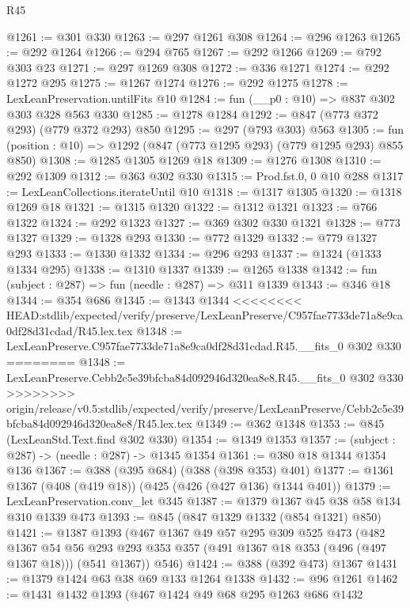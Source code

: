 \begin{lexlean}{R45}
\begin{coremodule}
{{{{{{{{{@1261 := @301 @330
@1263 := @297 @1261 @308
@1264 := @296 @1263
@1265 := @292 @1264
@1266 := @294 @765
@1267 := @292 @1266
@1269 := @792 @303 @23
@1271 := @297 @1269 @308
@1272 := @336 @1271
@1274 := @292 @1272 @295
@1275 := @1267 @1274
@1276 := @292 @1275
@1278 := LexLeanPreservation.untilFits @10
@1284 := fun (__p0 : @10) => @837 @302 @303 @328 @563 @330
@1285 := @1278 @1284
@1292 := @847 (@773 @372 @293) (@779 @372 @293) @850
@1295 := @297 (@793 @303) @563
@1305 := fun (position : @10) => @1292 (@847 (@773 @1295 @293) (@779 @1295 @293) @855 @850)
@1308 := @1285 @1305 @1269 @18
@1309 := @1276 @1308
@1310 := @292 @1309
@1312 := @363 @302 @330
@1315 := Prod.fst.{0, 0} @10 @288
@1317 := LexLeanCollections.iterateUntil @10
@1318 := @1317 @1305
@1320 := @1318 @1269 @18
@1321 := @1315 @1320
@1322 := @1312 @1321
@1323 := @766 @1322
@1324 := @292 @1323
@1327 := @369 @302 @330 @1321
@1328 := @773 @1327
@1329 := @1328 @293
@1330 := @772 @1329
@1332 := @779 @1327 @293
@1333 := @1330 @1332
@1334 := @296 @293
@1337 := @1324 (@1333 @1334 @295)
@1338 := @1310 @1337
@1339 := @1265 @1338
@1342 := fun (subject : @287) => fun (needle : @287) => @311 @1339
@1343 := @346 @18
@1344 := @354 @686
@1345 := @1343 @1344
<<<<<<<< HEAD:stdlib/expected/verify/preserve/LexLeanPreserve/C957fae7733de71a8e9ca0df28d31cdad/R45.lex.tex
@1348 := LexLeanPreserve.C957fae7733de71a8e9ca0df28d31cdad.R45.__fits_0 @302 @330
========
@1348 := LexLeanPreserve.Cebb2c5e39bfcba84d092946d320ea8e8.R45.__fits_0 @302 @330
>>>>>>>> origin/release/v0.5:stdlib/expected/verify/preserve/LexLeanPreserve/Cebb2c5e39bfcba84d092946d320ea8e8/R45.lex.tex
@1349 := @362 @1348
@1353 := @845 (LexLeanStd.Text.find @302 @330)
@1354 := @1349 @1353
@1357 := (subject : @287) -> (needle : @287) -> @1345 @1354
@1361 := @380 @18 @1344 @1354 @136
@1367 := @388 (@395 @684) (@388 (@398 @353) @401)
@1377 := @1361 @1367 (@408 (@419 @18)) (@425 (@426 (@427 @136) @1344 @401))
@1379 := LexLeanPreservation.conv_let @345
@1387 := @1379 @1367 @45 @38 @58 @134 @310 @1339 @473
@1393 := @845 (@847 @1329 @1332 (@854 @1321) @850)
@1421 := @1387
    @1393
    (@467
      @1367
      @49
      @57
      @295
      @309
      @525
      @473
      (@482
        @1367
        @54
        @56
        @293
        @293
        @353
        @357
        (@491 @1367 @18 @353 (@496 (@497 @1367 @18)))
        (@541 @1367))
      @546)
@1424 := @388 (@392 @473) @1367
@1431 := @1379 @1424 @63 @38 @69 @133 @1264 @1338
@1432 := @96 @1261
@1462 := @1431
    @1432
    @1393
    (@467
      @1424
      @49
      @68
      @295
      @1263
      @686
      @1432
}}}}}}}}}
\end{coremodule}
\end{lexlean}
